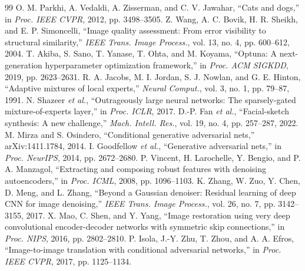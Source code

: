 \documentclass[conference]{IEEEtran}
\begin{document}
\begin{thebibliography}{99}
 O. M. Parkhi, A. Vedaldi, A. Zisserman, and C. V. Jawahar, ``Cats and dogs,'' in \emph{Proc. IEEE CVPR}, 2012, pp. 3498--3505.
 Z. Wang, A. C. Bovik, H. R. Sheikh, and E. P. Simoncelli, ``Image quality assessment: From error visibility to structural similarity,'' \emph{IEEE Trans. Image Process.}, vol. 13, no. 4, pp. 600--612, 2004.
 T. Akiba, S. Sano, T. Yanase, T. Ohta, and M. Koyama, ``Optuna: A next-generation hyperparameter optimization framework,'' in \emph{Proc. ACM SIGKDD}, 2019, pp. 2623--2631.
 R. A. Jacobs, M. I. Jordan, S. J. Nowlan, and G. E. Hinton, ``Adaptive mixtures of local experts,'' \emph{Neural Comput.}, vol. 3, no. 1, pp. 79--87, 1991.
 N. Shazeer \emph{et al.}, ``Outrageously large neural networks: The sparsely-gated mixture-of-experts layer,'' in \emph{Proc. ICLR}, 2017.
 D.-P. Fan \emph{et al.}, ``Facial-sketch synthesis: A new challenge,'' \emph{Mach. Intell. Res.}, vol. 19, no. 4, pp. 257--287, 2022.
 M. Mirza and S. Osindero, ``Conditional generative adversarial nets,'' arXiv:1411.1784, 2014.
 I. Goodfellow \emph{et al.}, ``Generative adversarial nets,'' in \emph{Proc. NeurIPS}, 2014, pp. 2672--2680.
 P. Vincent, H. Larochelle, Y. Bengio, and P. A. Manzagol, ``Extracting and composing robust features with denoising autoencoders,'' in \emph{Proc. ICML}, 2008, pp. 1096--1103.
 K. Zhang, W. Zuo, Y. Chen, D. Meng, and L. Zhang, ``Beyond a Gaussian denoiser: Residual learning of deep CNN for image denoising,'' \emph{IEEE Trans. Image Process.}, vol. 26, no. 7, pp. 3142--3155, 2017.
 X. Mao, C. Shen, and Y. Yang, ``Image restoration using very deep convolutional encoder-decoder networks with symmetric skip connections,'' in \emph{Proc. NIPS}, 2016, pp. 2802--2810.
 P. Isola, J.-Y. Zhu, T. Zhou, and A. A. Efros, ``Image-to-image translation with conditional adversarial networks,'' in \emph{Proc. IEEE CVPR}, 2017, pp. 1125--1134.
\end{thebibliography}
\end{document}
